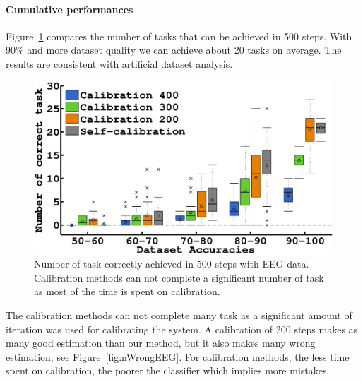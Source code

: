 
\paragraph{Cumulative performances}

Figure~\ref{fig:nCorrectEEG} compares the number of tasks that can be achieved in 500 steps. With 90\% and more dataset quality we can achieve about 20 tasks on average. The results are consistent with artificial dataset analysis.

\begin{figure}[!ht]
\centering
\includegraphics[width=\columnwidth]{img/plots_aaai/plot_EEG_calib_nCorrect.eps}
\caption{Number of task correctly achieved in 500 steps with EEG data. Calibration methods can not complete a significant number of task as most of the time is spent on calibration.}
\label{fig:nCorrectEEG}
\end{figure} 

The calibration methods can not complete many task as a significant amount of iteration was used for calibrating the system. A calibration of 200 steps makes as many good estimation than our method, but it also makes many wrong estimation, see Figure~\ref{fig:nWrongEEG}. For calibration methods, the less time spent on calibration, the poorer the classifier which implies more mistakes.

